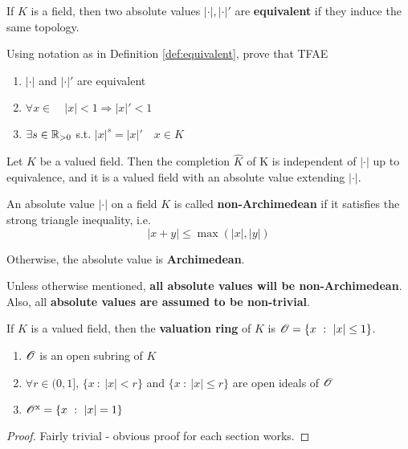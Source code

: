 \documentclass[a4paper]{article}
\begin{document}
{\begin{defi-num}[Equivalent]\label{def:equivalent}
	If $K$ is a field, then two absolute values $|\cdot|,|\cdot|'$ are \textbf{equivalent} if they induce the same topology.
\end{defi-num}

\begin{exer-num}
	Using notation as in Definition \ref{def:equivalent}, prove that TFAE
	
	\begin{enumerate}
		\item $|\cdot|$ and $|\cdot|'$ are equivalent\\
		\item $\forall x\in\quad|x|<1\Rightarrow|x|'<1$\\
		\item $\exists s\in\mathbb{R}_{>0}$ s.t. $|x|^s=|x|'\quad x\in K$
	\end{enumerate}
\end{exer-num}

\begin{exer-num}
	Let $K$ be a valued field. Then the completion $\hat{K}$ of K is independent of $|\cdot|$ up to equivalence, and it is a valued field with an absolute value extending $|\cdot|$.
\end{exer-num}

\begin{defi-num}[Archimedean]
	An absolute value $|\cdot|$ on a field $K$ is called \textbf{non-Archimedean} if it satisfies the strong triangle inequality, i.e.
	\[
		|x+y|\leq \max(|x|,|y|)
	\]
	
	Otherwise, the absolute value is \textbf{Archimedean}.
\end{defi-num}

Unless otherwise mentioned, \textbf{all absolute values will be non-Archimedean}. Also, all \textbf{absolute values are assumed to be non-trivial}.

\begin{defi}
	If $K$ is a valued field, then the \textbf{valuation ring} of $K$ is $\mathscr{O}=\{x\ :\ |x|\leq 1\}$.
\end{defi}

\begin{prop-num}
	\begin{enumerate}
		\item $\mathscr{O}$ is an open subring of $K$\\
		\item $\forall r\in(0,1]$, $\{x\ :\ |x|<r\}$ and $\{x\ :\ |x|\leq r\}$ are open ideals of $\mathscr{O}$\\
		\item $\calO^{\mathrm{x}}=\{x\ :\ |x|=1\}$
	\end{enumerate}
\end{prop-num}
\begin{proof}
	Fairly trivial - obvious proof for each section works.
\end{proof}

}
\end{document}
